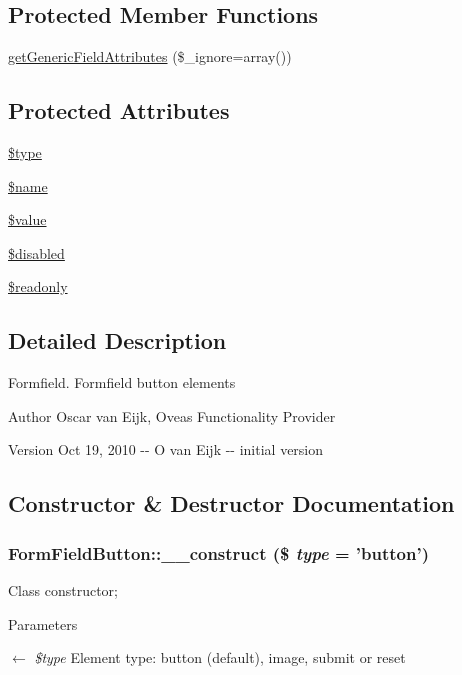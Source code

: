 \subsection*{Protected Member Functions}
\begin{DoxyCompactItemize}
\item 
\hyperlink{classFormField_a9f9d136ba8b4a793f22370aff43d592d}{getGenericFieldAttributes} (\$\_\-ignore=array())
\end{DoxyCompactItemize}
\subsection*{Protected Attributes}
\begin{DoxyCompactItemize}
\item 
\hyperlink{classFormField_a37bed21a1891e95be0e4a697e45ba51b}{\$type}
\item 
\hyperlink{classFormField_a23861f707bcd77bbace6300de9621746}{\$name}
\item 
\hyperlink{classFormField_a3c01e89834248eec8e2f145fbcfa0fbc}{\$value}
\item 
\hyperlink{classFormField_ab6f1907061890290e32cb2befc0a5f50}{\$disabled}
\item 
\hyperlink{classFormField_a78ba5d4b9127e75e8ccf86f397b5d9ac}{\$readonly}
\end{DoxyCompactItemize}


\subsection{Detailed Description}
Formfield. Formfield button elements \begin{DoxyAuthor}{Author}
Oscar van Eijk, Oveas Functionality Provider 
\end{DoxyAuthor}
\begin{DoxyVersion}{Version}
Oct 19, 2010 -\/-\/ O van Eijk -\/-\/ initial version 
\end{DoxyVersion}


\subsection{Constructor \& Destructor Documentation}
\subsubsection[{\_\-\_\-construct}]{\setlength{\rightskip}{0pt plus 5cm}FormFieldButton::\_\-\_\-construct (\$ {\em type} = {\ttfamily 'button'})}\label{classFormFieldButton_aa531597334029bd24bcaf4236d540d69}
Class constructor; 
\begin{DoxyParams}{Parameters}
\item[\mbox{$\leftarrow$} {\em \$type}]Element type: button (default), image, submit or reset \end{DoxyParams}


